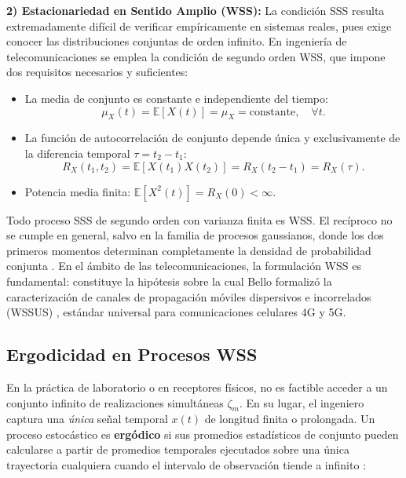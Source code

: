 \documentclass[conference]{IEEEtran}
\begin{document}
\textbf{2) Estacionariedad en Sentido Amplio (WSS):} La condición SSS resulta extremadamente difícil de verificar empíricamente en sistemas reales, pues exige conocer las distribuciones conjuntas de orden infinito. En ingeniería de telecomunicaciones se emplea la condición de segundo orden WSS, que impone dos requisitos necesarios y suficientes:
\begin{itemize}
    \item La media de conjunto es constante e independiente del tiempo:
    \begin{equation}
    \mu_X(t) = \mathbb{E}[X(t)] = \mu_X = \text{constante}, \quad \forall t.
    \label{eq:mean_wss}
    \end{equation}
    \item La función de autocorrelación de conjunto depende única y exclusivamente de la diferencia temporal $\tau = t_2 - t_1$:
    \begin{equation}
    R_X(t_1, t_2) = \mathbb{E}[X(t_1) X(t_2)] = R_X(t_2 - t_1) = R_X(\tau).
    \label{eq:rx_wss}
    \end{equation}
    \item Potencia media finita: $\mathbb{E}[X^2(t)] = R_X(0) < \infty$.
\end{itemize}
Todo proceso SSS de segundo orden con varianza finita es WSS. El recíproco no se cumple en general, salvo en la familia de procesos gaussianos, donde los dos primeros momentos determinan completamente la densidad de probabilidad conjunta \cite{papoulis2002}. En el ámbito de las telecomunicaciones, la formulación WSS es fundamental: constituye la hipótesis sobre la cual Bello formalizó la caracterización de canales de propagación móviles dispersivos e incorrelados (WSSUS) \cite{bello1963}, estándar universal para comunicaciones celulares 4G y 5G.

\subsection{Ergodicidad en Procesos WSS}
En la práctica de laboratorio o en receptores físicos, no es factible acceder a un conjunto infinito de realizaciones simultáneas $\zeta_m$. En su lugar, el ingeniero captura una \textit{única} señal temporal $x(t)$ de longitud finita o prolongada. Un proceso estocástico es \textbf{ergódico} si sus promedios estadísticos de conjunto pueden calcularse a partir de promedios temporales ejecutados sobre una única trayectoria cualquiera cuando el intervalo de observación tiende a infinito \cite{leon2008}:
\end{document}
